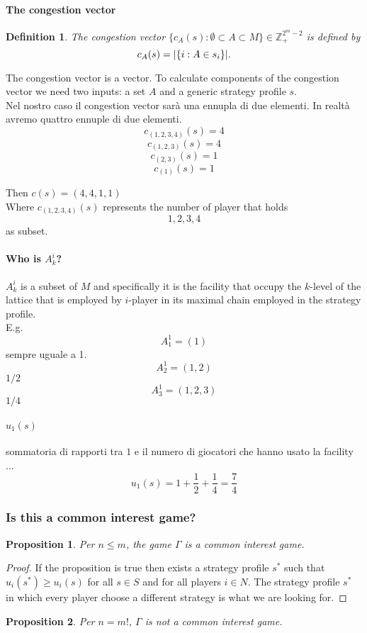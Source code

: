 \documentclass{article}
\newtheorem{defn}{Definition}
\newtheorem{prop}{Proposition}
\begin{document}
\paragraph{The congestion vector}
\begin{defn}
	The congestion vector $\{c_A(s):\emptyset\subset A\subset M\}\in\mathbb Z_+^{2^m-2}$ is defined by $$c_A(s)=|\{i:A\in s_i\}|\text .$$
\end{defn}
The congestion vector is a vector. To calculate components of the congestion vector we need two inputs: a set $A$ and a generic strategy profile $s$. \\

Nel nostro caso il congestion vector sar\`a una ennupla di due elementi. In realt\`a avremo quattro ennuple di due elementi.
\[ c_{(1,2,3,4)} (s) = 4 \]
\[ c_{(1,2,3)}   (s) = 4 \]
\[ c_{(2,3)}     (s) = 1 \]
\[ c_{(1)}       (s) = 1 \]

Then $c(s) = (4,4,1,1)$ \\

Where $c_{(1,2,3,4)}(s)$ represents the number of player that holds $$ 1,2,3,4 $$ as subset.

\paragraph{Who is $A_k^i$?}
$A_k^i$ is a subset of $M$ and specifically it is the facility that occupy the $k$-level of the lattice that is employed by $i$-player in its maximal chain employed in the strategy profile. \\

E.g. 
\[ A_1^1 = (1) \] sempre uguale a 1.  
\[ A_2^1 = (1,2) \]  $1/2$
\[ A_3^1 = (1,2,3) \]  $1/4$


\paragraph{$u_1(s)$}
sommatoria di rapporti tra $1$ e il numero di giocatori che hanno usato la facility ...
\[
	u_1(s) = 1 + \frac{1}{2} + \frac{1}{4} = \frac{7}{4}
\]

 

\subsubsection{Is this a common interest game?}
\begin{prop}
  Per $n \le m$, the game $\Gamma$ is a common interest game. 
\end{prop}
\begin{proof}
 If the proposition is true then exists a strategy profile $s^*$ such that $u_i(s^*) \ge u_i(s)$ for all $s \in S$ and for all players $i \in N$. The strategy profile $s^*$ in which every player choose a different strategy is what we are looking for. 
\end{proof}
\begin{prop}
 Per $n=m!$, $\Gamma$ is not a common interest game.
\end{prop}
\end{document}
